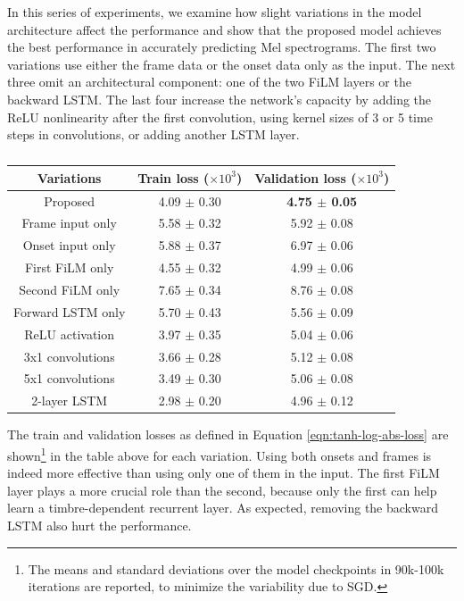 In this series of experiments, we examine how slight variations in the model architecture affect the performance and show that the proposed model achieves the best performance in accurately predicting Mel spectrograms.
The first two variations use either the frame data or the onset data only as the input.
The next three omit an architectural component: one of the two FiLM layers or the backward LSTM.
The last four increase the network's capacity by adding the ReLU nonlinearity after the first convolution, using kernel sizes of 3 or 5 time steps in convolutions, or adding another LSTM layer.
\begin{table}
	\centering
	\renewcommand\arraystretch{1.2}
	\setlength\tabcolsep{0.3em}
	\begin{tabular}{c|c|c}
		Variations & Train loss ($\times 10^3$) & Validation loss ($\times 10^3$)\\
		\hline
		Proposed & 4.09 $\pm$ 0.30 & \textbf{4.75 $\pm$ 0.05} \\
		\hline
		Frame input only & 5.58 $\pm$ 0.32 & 5.92 $\pm$ 0.08 \\
		Onset input only & 5.88 $\pm$ 0.37 &  6.97 $\pm$ 0.06 \\
		\hline
		First FiLM only & 4.55 $\pm$ 0.32 & 4.99 $\pm$ 0.06 \\
		Second FiLM only & 7.65 $\pm$ 0.34 & 8.76 $\pm$ 0.08 \\
		Forward LSTM only & 5.70 $\pm$ 0.43 & 5.56 $\pm$ 0.09 \\
		\hline
		ReLU activation & 3.97 $\pm$ 0.35 & 5.04 $\pm$ 0.06 \\
		3x1 convolutions & 3.66 $\pm$ 0.28 & 5.12 $\pm$ 0.08 \\
		5x1 convolutions & 3.49 $\pm$ 0.30 & 5.06 $\pm$ 0.08 \\
		2-layer LSTM & 2.98 $\pm$ 0.20 & 4.96 $\pm$ 0.12 \\
	\end{tabular}
	\vspace{1em}
	\caption{}\label{tab:synthesis-ablation}
\end{table}
The train and validation losses as defined in Equation \ref{eqn:tanh-log-abs-loss} are shown\footnote{The means and standard deviations over the model checkpoints in 90k-100k iterations are reported, to minimize the variability due to SGD.} in the table above for each variation.
Using both onsets and frames is indeed more effective than using only one of them in the input.
The first FiLM layer plays a more crucial role than the second, because only the first can help learn a timbre-dependent recurrent layer.
As expected, removing the backward LSTM also hurt the performance.

